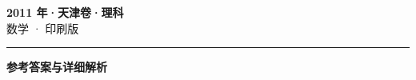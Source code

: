 \documentclass[zihao=5, a4paper]{ctexart}
\begin{document}
\begin{center}
  {\Large\bfseries 2011 年·天津卷·理科}\\[4pt]
  {\large 数学 · 印刷版}
\end{center}
\medskip
{}

\par\bigskip\hrule\bigskip
{}
\begin{center}{\large\bfseries 参考答案与详细解析}\end{center}
\smallskip

\end{document}
